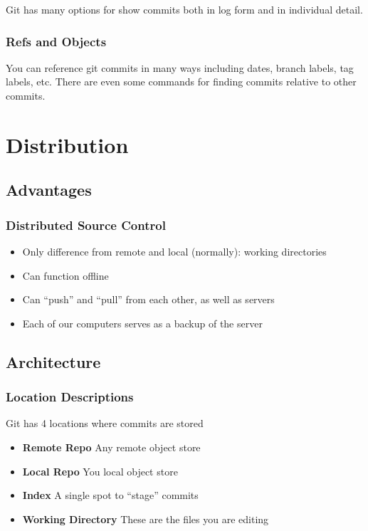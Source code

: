 Git has many options for show commits both in log form and in individual detail.

\begin{frame}
  \frametitle{Refs and Objects}
    \pause
    \pause
    \pause
\end{frame}

You can reference git commits in many ways including dates, branch labels, tag
labels, etc. There are even some commands for finding commits relative to other
commits.

\section{Distribution}

\subsection{Advantages}

\begin{frame}
  \frametitle{Distributed Source Control}
  \begin{itemize}
  \item Only difference from remote and local (normally): working directories
    \pause
  \item Can function offline
    \pause
  \item Can ``push'' and ``pull'' from each other, as well as servers
    \pause
  \item Each of our computers serves as a backup of the server
  \end{itemize}
\end{frame}

\subsection{Architecture}

\begin{frame}
  \frametitle{Location Descriptions}
  Git has 4 locations where commits are stored
  \pause
  \begin{itemize}
  \item \textbf{Remote Repo} Any remote object store
    \pause
  \item \textbf{Local Repo} You local object store
    \pause
  \item \textbf{Index} A single spot to ``stage'' commits
    \pause
  \item \textbf{Working Directory} These are the files you are editing
  \end{itemize}
\end{frame}

